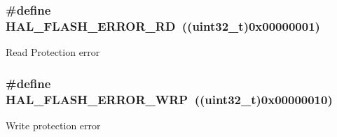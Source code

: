 \subsubsection[{\texorpdfstring{H\+A\+L\+\_\+\+F\+L\+A\+S\+H\+\_\+\+E\+R\+R\+O\+R\+\_\+\+RD}{HAL_FLASH_ERROR_RD}}]{\setlength{\rightskip}{0pt plus 5cm}\#define H\+A\+L\+\_\+\+F\+L\+A\+S\+H\+\_\+\+E\+R\+R\+O\+R\+\_\+\+RD~((uint32\+\_\+t)0x00000001)}\hypertarget{group___f_l_a_s_h___error___code_ga33008f2ad5085cd4158dd260fb2d124d}{}\label{group___f_l_a_s_h___error___code_ga33008f2ad5085cd4158dd260fb2d124d}
Read Protection error 
\subsubsection[{\texorpdfstring{H\+A\+L\+\_\+\+F\+L\+A\+S\+H\+\_\+\+E\+R\+R\+O\+R\+\_\+\+W\+RP}{HAL_FLASH_ERROR_WRP}}]{\setlength{\rightskip}{0pt plus 5cm}\#define H\+A\+L\+\_\+\+F\+L\+A\+S\+H\+\_\+\+E\+R\+R\+O\+R\+\_\+\+W\+RP~((uint32\+\_\+t)0x00000010)}\hypertarget{group___f_l_a_s_h___error___code_ga27e871d85f9311272098315bc3723075}{}\label{group___f_l_a_s_h___error___code_ga27e871d85f9311272098315bc3723075}
Write protection error 